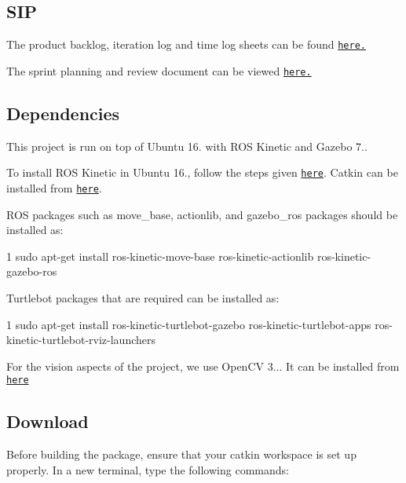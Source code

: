  

\subsection*{S\+IP}

The product backlog, iteration log and time log sheets can be found \href{https://docs.google.com/spreadsheets/d/1RWIvnbdE3t9a1EoGMhIvIEiinyssCJ5bO6Itf2WrIy8/edit?usp=sharing}{\tt here.}

The sprint planning and review document can be viewed \href{https://docs.google.com/document/d/1Zp-uh8ouf0MiTm6qED7pZ7B7P1d_7mmyq6RMpuOTYXM/edit?usp=sharing}{\tt here.}

\subsection*{Dependencies}

This project is run on top of Ubuntu 16. with R\+OS Kinetic and Gazebo 7..

To install R\+OS Kinetic in Ubuntu 16., follow the steps given \href{http://wiki.ros.org/kinetic/Installation/Ubuntu}{\tt here}. Catkin can be installed from \href{http://wiki.ros.org/catkin}{\tt here}.

R\+OS packages such as move\+\_\+base, actionlib, and gazebo\+\_\+ros packages should be installed as\+:


\begin{DoxyCode}
1 sudo apt-get install ros-kinetic-move-base ros-kinetic-actionlib ros-kinetic-gazebo-ros
\end{DoxyCode}


Turtlebot packages that are required can be installed as\+:


\begin{DoxyCode}
1 sudo apt-get install ros-kinetic-turtlebot-gazebo ros-kinetic-turtlebot-apps
       ros-kinetic-turtlebot-rviz-launchers
\end{DoxyCode}


For the vision aspects of the project, we use Open\+CV 3... It can be installed from \href{https://www.learnopencv.com/install-opencv3-on-ubuntu/}{\tt here}

\subsection*{Download}

Before building the package, ensure that your catkin workspace is set up properly. In a new terminal, type the following commands\+:



